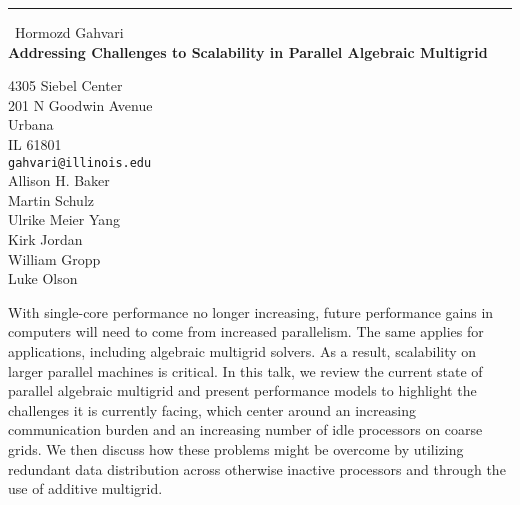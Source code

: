 \documentclass{report}
\begin{document}
\begin{center}
\rule{6in}{1pt} \
{\large Hormozd Gahvari \\
{\bf Addressing Challenges to Scalability in Parallel Algebraic Multigrid}}

4305 Siebel Center \\ 201 N Goodwin Avenue \\ Urbana \\ IL 61801
\\
{\tt gahvari@illinois.edu}\\
Allison H. Baker\\
Martin Schulz\\
Ulrike Meier Yang\\
Kirk Jordan\\
William Gropp\\
Luke Olson\end{center}

With single-core performance no longer increasing, future performance
gains in computers will need to come from increased parallelism. The same
applies for applications, including algebraic multigrid solvers. As a
result, scalability on larger parallel machines is critical. In this
talk, we review the current state of parallel algebraic multigrid and
present performance models to highlight the challenges it is currently
facing, which center around an increasing communication burden and an
increasing number of idle processors on coarse grids. We then discuss how
these problems might be overcome by utilizing redundant data distribution
across otherwise inactive processors and through the use of additive
multigrid.
\end{document}
